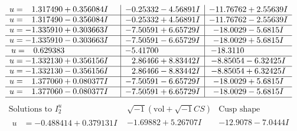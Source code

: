 \documentclass[1p]{elsarticle_modified}
\theoremstyle{definition}
\newcommand{\I}{\sqrt{-1}}
\begin{document}
$$\begin{array}{c|c|c}
\begin{aligned}
u &= \phantom{-}1.317490 + 0.356084 I\end{aligned}
 & -0.25332 - 4.56891 I & -11.76762 + 2.55639 I \\ \hline\begin{aligned}
u &= \phantom{-}1.317490 - 0.356084 I\end{aligned}
 & -0.25332 + 4.56891 I & -11.76762 - 2.55639 I \\ \hline\begin{aligned}
u &= -1.335910 + 0.303663 I\end{aligned}
 & -7.50591 + 6.65729 I & -18.0029 - 5.6815 I \\ \hline\begin{aligned}
u &= -1.335910 - 0.303663 I\end{aligned}
 & -7.50591 - 6.65729 I & -18.0029 + 5.6815 I \\ \hline\begin{aligned}
u &= \phantom{-}0.629383\phantom{ +0.000000I}\end{aligned}
 & -5.41700\phantom{ +0.000000I} & -18.3110\phantom{ +0.000000I} \\ \hline\begin{aligned}
u &= -1.332130 + 0.356156 I\end{aligned}
 & \phantom{-}2.86466 + 8.83442 I & -8.85054 - 6.32425 I \\ \hline\begin{aligned}
u &= -1.332130 - 0.356156 I\end{aligned}
 & \phantom{-}2.86466 - 8.83442 I & -8.85054 + 6.32425 I \\ \hline\begin{aligned}
u &= \phantom{-}1.377060 + 0.080377 I\end{aligned}
 & -7.50591 - 6.65729 I & -18.0029 + 5.6815 I \\ \hline\begin{aligned}
u &= \phantom{-}1.377060 - 0.080377 I\end{aligned}
 & -7.50591 + 6.65729 I & -18.0029 - 5.6815 I\\
 \hline 
 \end{array}$$\newpage$$\begin{array}{c|c|c}  
\text{Solutions to }I^u_{2}& \I (\text{vol} + \sqrt{-1}CS) & \text{Cusp shape}\\
 \hline 
\begin{aligned}
u &= -0.488414 + 0.379131 I\end{aligned}
 & -1.69882 + 5.26707 I & -12.9078 - 7.0444 I \\ \hline\begin{aligned}

\end{aligned}
\end{array}$$
\end{document}
